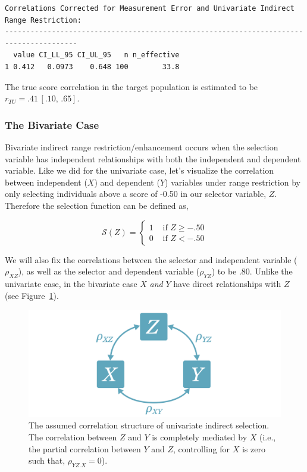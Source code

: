 \documentclass[
  letterpaper,
  DIV=11,
  numbers=noendperiod]{scrreprt}
\begin{document}
\begin{tcolorbox}
\begin{verbatim}
Correlations Corrected for Measurement Error and Univariate Indirect Range Restriction:
---------------------------------------------------------------------------------------
  value CI_LL_95 CI_UL_95   n n_effective
1 0.412   0.0973    0.648 100        33.8
\end{verbatim}

The true score correlation in the target population is estimated to be
\(r_{TU} = .41\, [.10,\, .65]\).

\end{tcolorbox}

\hypertarget{the-bivariate-case-2}{%
\subsubsection*{The Bivariate Case}\label{the-bivariate-case-2}}

Bivariate indirect range restriction/enhancement occurs when the
selection variable has independent relationships with both the
independent and dependent variable. Like we did for the univariate case,
let's visualize the correlation between independent (\(X\)) and
dependent (\(Y\)) variables under range restriction by only selecting
individuals above a score of -0.50 in our selector variable, \(Z\).
Therefore the selection function can be defined as,

\[
\mathcal{S}(Z)=\begin{cases} 1 &\text{ if } Z \geq-.50 \\  0 &\text{ if } Z <-.50  \end{cases}
\]

We will also fix the correlations between the selector and independent
variable (\(\rho_{XZ}\)), as well as the selector and dependent variable
(\(\rho_{YZ}\)) to be .80. Unlike the univariate case, in the bivariate
case \(X\) \emph{and} \(Y\) have direct relationships with \(Z\) (see
Figure~\ref{fig-corr-model-biv}).

\begin{figure}[H]

{\centering \includegraphics{figure/indirect_select_corr_model_biv.png}

}

\caption{\label{fig-corr-model-biv}The assumed correlation structure of
univariate indirect selection. The correlation between \(Z\) and \(Y\)
is completely mediated by \(X\) (i.e., the partial correlation between
\(Y\) and \(Z\), controlling for \(X\) is zero such that,
\(\rho_{YZ.X}=0\)).}

\end{figure}
\end{document}
